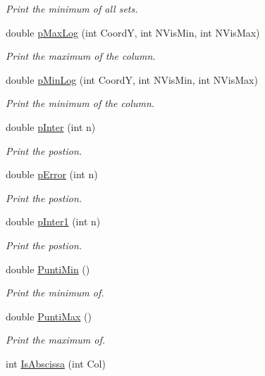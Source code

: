 \begin{DoxyCompactItemize}
\begin{DoxyCompactList}\small\item\em Print the minimum of all sets. \end{DoxyCompactList}\item 
double \hyperlink{classVarDatFile_abb42c2238af97f451a3ebf3226d13639}{p\+Max\+Log} (int CoordY, int N\+Vis\+Min, int N\+Vis\+Max)
\begin{DoxyCompactList}\small\item\em Print the maximum of the column. \end{DoxyCompactList}\item 
double \hyperlink{classVarDatFile_af5ebcfc4c951d36ead08fdc20974b5ff}{p\+Min\+Log} (int CoordY, int N\+Vis\+Min, int N\+Vis\+Max)
\begin{DoxyCompactList}\small\item\em Print the minimum of the column. \end{DoxyCompactList}\item 
double \hyperlink{classVarDatFile_ac9b6015f7712a2bffde3a609145331af}{p\+Inter} (int n)
\begin{DoxyCompactList}\small\item\em Print the postion. \end{DoxyCompactList}\item 
double \hyperlink{classVarDatFile_ab59237e1fbf8ee4c45f7f189799ed008}{p\+Error} (int n)
\begin{DoxyCompactList}\small\item\em Print the postion. \end{DoxyCompactList}\item 
double \hyperlink{classVarDatFile_a31c516fdbe042c50ffdf5d3dc74521ab}{p\+Inter1} (int n)
\begin{DoxyCompactList}\small\item\em Print the postion. \end{DoxyCompactList}\item 
double \hyperlink{classVarDatFile_a9998056e2576481a913421ae6e148179}{Punti\+Min} ()
\begin{DoxyCompactList}\small\item\em Print the minimum of. \end{DoxyCompactList}\item 
double \hyperlink{classVarDatFile_a0a3ba11d08ae946dfdf46d0b33047211}{Punti\+Max} ()
\begin{DoxyCompactList}\small\item\em Print the maximum of. \end{DoxyCompactList}\item 
int \hyperlink{classVarDatFile_a2d7aa499f16ec4d2e15ac60bccbb8441}{Is\+Abscissa} (int Col)\hypertarget{classVarDatFile_a2d7aa499f16ec4d2e15ac60bccbb8441}{}\label{classVarDatFile_a2d7aa499f16ec4d2e15ac60bccbb8441}


\end{DoxyCompactItemize}
